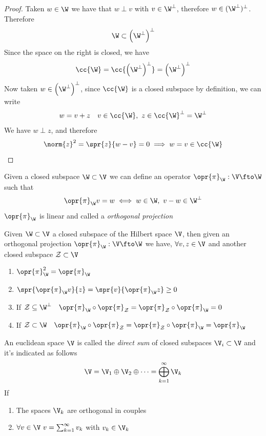 \documentclass[../mmf.tex]{subfiles}
\begin{document}
\begin{proof}
	Taken $w\in\W$ we have that $w\perp v$ with $v\in\W^\perp$, therefore $w\in(\W^\perp)^\perp$. Therefore
	\begin{equation*}
		\W\subset\left( \W^\perp \right)^\perp
	\end{equation*}
	Since the space on the right is closed, we have
	\begin{equation*}
		\cc{\W}=\cc{\left( \W^\perp \right)^\perp}=\left( \W^\perp \right)^\perp
	\end{equation*}
	Now taken $w\in\left( \W^\perp \right)^\perp$, since $\cc{\W}$ is a closed subspace by definition, we can write
	\begin{equation*}
		w=v+z\quad v\in\cc{\W},\ z\in\cc{\W}^\perp=\W^\perp
	\end{equation*}
	We have $w\perp z$, and therefore
	\begin{equation*}
		\norm{z}^2=\spr{z}{w-v}=0\implies{} w=v\in\cc{\W}
	\end{equation*}
\end{proof}
\begin{dfn}
	Given a closed subspace $\W\subset\V$ we can define an operator $\opr{\pi}_\W:\V\fto\W$ such that
	\begin{equation}
		\opr{\pi}_\W v=w\iff w\in\W,\ v-w\in\W^\perp
		\label{eq:orthprojection}
	\end{equation}
	$\opr{\pi}_\W$ is linear and called a \textit{orthogonal projection}
\end{dfn}
\begin{thm}
	Given $\W\subset\V$ a closed subspace of the Hilbert space $\V$, then given an orthogonal projection $\opr{\pi}_\W:\V\fto\W$ we have, $\forall v,z\in\V$ and another closed subspace $\mathcal{Z}\subset\V$
	\begin{enumerate}
	\item $\opr{\pi}_\W^2=\opr{\pi}_\W$
	\item $\spr{\opr{\pi}_\W v}{z}=\spr{v}{\opr{\pi}_\W z}\ge0$
	\item If $\mathcal{Z}\subseteq\W^\perp\quad\opr{\pi}_\W\circ\opr{\pi}_{\mathcal{Z}}=\opr{\pi}_{\mathcal{Z}}\circ\opr{\pi}_\W=0$
	\item If $\mathcal{Z}\subset\W\quad\opr{\pi}_\W\circ\opr{\pi}_{\mathcal{Z}}=\opr{\pi}_{\mathcal{Z}}\circ\opr{\pi}_\W=\opr{\pi}_\W$
	\end{enumerate}
\end{thm}
\begin{dfn}
	An euclidean space $\V$ is called the \textit{direct sum} of closed subspaces $\V_i\subset\V$ and it's indicated as follows
	\begin{equation}
		\V=\V_1\oplus\V_2\oplus\cdots=\bigoplus_{k=1}^\infty\V_k
		\label{eq:directsum}
	\end{equation}
	If
	\begin{enumerate}
	\item The spaces $\V_k$ are orthogonal in couples
	\item $\forall v\in\V\ v=\sum_{k=1}^\infty v_k$ with $v_k\in\V_k$
	\end{enumerate}
\end{dfn}
\end{document}
